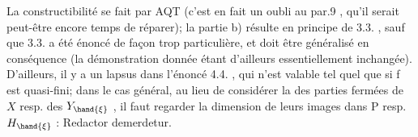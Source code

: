 
La constructibilité se fait par AQT (c'est en fait un oubli au
par.9 , qu'il serait peut-être encore temps de réparer); la partie b)
résulte en principe de 3.3. , sauf que 3.3. a été énoncé de façon trop
particulière, et doit être généralisé en conséquence (la démonstration
donnée étant d'ailleurs essentiellement inchangée). D'ailleurs, il y
a un lapsus dans l'énoncé 4.4. , qui n'est valable tel quel que si f
est quasi-fini; dans le cas général, au lieu de considérer la 
des parties fermées de $X$ resp. des $Y_{\hand{\xi}}$ , il faut regarder la dimension
de leurs images dans P resp. $H_{\hand{\xi}}$ : Redactor demerdetur.

